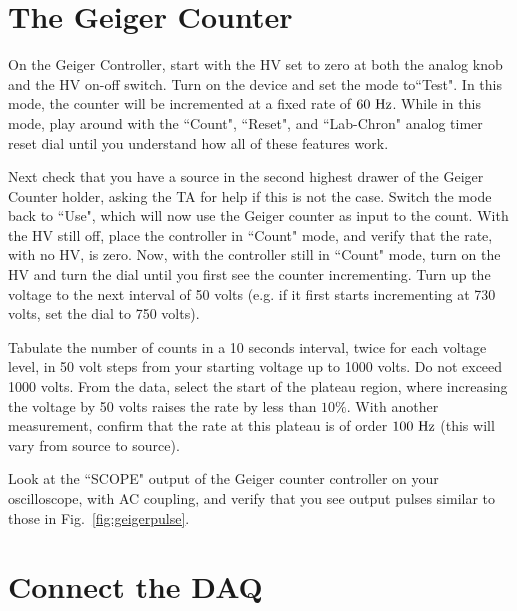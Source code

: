 \documentclass[12pt]{article}
\begin{document}
\section{The Geiger Counter}

On the Geiger Controller, start with the HV set to zero at both the
analog knob and the HV on-off switch.  Turn on the device and set the
mode to``Test".  In this mode, the counter will be incremented at a
fixed rate of $60~\rm Hz$.  While in this mode, play around with the
``Count", ``Reset", and ``Lab-Chron" analog timer reset dial until you
understand how all of these features work.

Next check that you have a source in the second highest drawer of the
Geiger Counter holder, asking the TA for help if this is not the case.
Switch the mode back to ``Use", which will now use the Geiger counter
as input to the count.  With the HV still off, place the controller in
``Count" mode, and verify that the rate, with no HV, is zero.  Now,
with the controller still in ``Count" mode, turn on the HV and turn
the dial until you first see the counter incrementing.  Turn up the
voltage to the next interval of 50 volts (e.g. if it first starts
incrementing at 730 volts, set the dial to 750 volts).

Tabulate the number of counts in a 10 seconds interval, twice for each voltage level, in 50 volt steps from your starting voltage up to 1000 volts.  Do not exceed 1000 volts.  From the data, select the start of the plateau region, where increasing the voltage by 50 volts raises the rate by less than $10\%$.  With another measurement, confirm that the rate at this plateau is of order $100~\rm Hz$ (this will vary from source to source).

Look at the ``SCOPE" output of the Geiger counter controller on your
oscilloscope, with AC coupling, and verify that you see output pulses
similar to those in Fig.~\ref{fig:geigerpulse}.

\section{Connect the DAQ}
\end{document}
